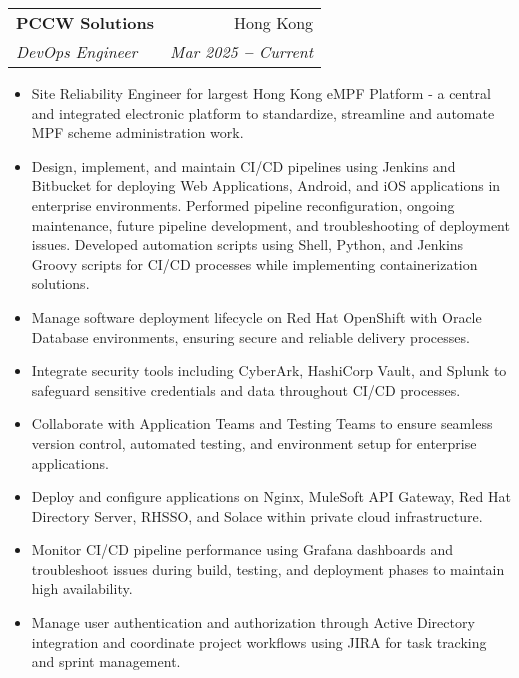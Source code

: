 \documentclass[letterpaper,11pt]{article}
\makeatletter
\newcommand{\resumeItem}[1]{
  \item\small{
    {#1 \vspace{-2pt}}
  }
}
\newcommand{\resumeSubheading}[4]{
  \vspace{-2pt}\item
    \begin{tabular*}{0.97\textwidth}[t]{l@{\extracolsep{\fill}}r}
      \textbf{#1} & #2 \\
      \textit{\small#3} & \textit{\small #4} \\
    \end{tabular*}\vspace{-7pt}
}
\newcommand{\resumeItemListStart}{\begin{itemize}}
\newcommand{\resumeItemListEnd}{\end{itemize}\vspace{-5pt}}
\makeatother
\begin{document}
    \resumeSubheading
      {PCCW Solutions}{Hong Kong}
      {DevOps Engineer}{Mar 2025 \textbf{--} Current}
        \resumeItemListStart
            \resumeItem{Site Reliability Engineer for largest Hong Kong eMPF Platform - a central and integrated electronic platform to standardize, streamline and automate MPF scheme administration work.}
            \resumeItem{Design, implement, and maintain CI/CD pipelines using Jenkins and Bitbucket for deploying Web Applications, Android, and iOS applications in enterprise environments. Performed pipeline reconfiguration, ongoing maintenance, future pipeline development, and troubleshooting of deployment issues. Developed automation scripts using Shell, Python, and Jenkins Groovy scripts for CI/CD processes while implementing containerization solutions.}
            \resumeItem{Manage software deployment lifecycle on Red Hat OpenShift with Oracle Database environments, ensuring secure and reliable delivery processes.}
            \resumeItem{Integrate security tools including CyberArk, HashiCorp Vault, and Splunk to safeguard sensitive credentials and data throughout CI/CD processes.}
            \resumeItem{Collaborate with Application Teams and Testing Teams to ensure seamless version control, automated testing, and environment setup for enterprise applications.}
            \resumeItem{Deploy and configure applications on Nginx, MuleSoft API Gateway, Red Hat Directory Server, RHSSO, and Solace within private cloud infrastructure.}
            \resumeItem{Monitor CI/CD pipeline performance using Grafana dashboards and troubleshoot issues during build, testing, and deployment phases to maintain high availability.}
            \resumeItem{Manage user authentication and authorization through Active Directory integration and coordinate project workflows using JIRA for task tracking and sprint management.}
        \resumeItemListEnd
\end{document}
